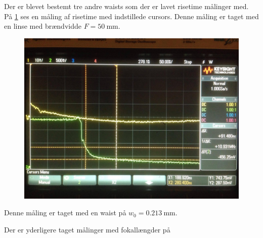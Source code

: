 \documentclass[main]{subfiles}
\begin{document}
Der er blevet bestemt tre andre waists som der er lavet risetime målinger med.
På \cref{fig:screenfigur} ses en måling af risetime med indstillede cursors. Denne måling er taget med en linse med brændvidde $F = \SI{50}{\milli\meter}$.
\begin{figure}[H]
  \includegraphics[width=\linewidth]{tegninger/screenfigur.png}
  \caption{}
  \label{fig:screenfigur}
\end{figure}
Denne måling er taget med en waist på $w_0 = \SI{0,213}{\milli\meter}$.

Der er yderligere taget målinger med fokallængder på $ $
\end{document}
